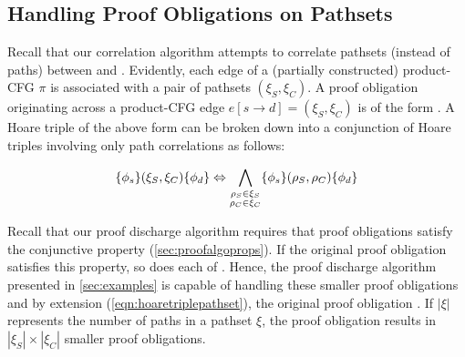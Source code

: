 \subsection{Handling Proof Obligations on Pathsets}
\label{sec:pathsethoaretriples}
Recall that our correlation algorithm attempts to correlate pathsets (instead of paths) between \sprog{} and \cprog{}.
Evidently, each edge of a (partially constructed) product-CFG $\pi$ is associated with a pair of pathsets $(\xi_S,\xi_C)$.
A proof obligation originating across a product-CFG edge $e[s \rightarrow d]=(\xi_S,\xi_C)$ is of
the form .
A Hoare triple of the above form can be broken down into a conjunction of Hoare triples involving only path correlations as follows:

\begin{equation}
\label{eqn:hoaretriplepathset}
\{\phi_s\}(\xi_S,\xi_C)\{\phi_d\} \Leftrightarrow \bigwedge_{\substack{\rho_S \in \xi_S \\ \rho_C \in \xi_C}} \{\phi_s\}(\rho_S,\rho_C)\{\phi_d\}
\end{equation}

Recall that our proof discharge algorithm requires that proof obligations satisfy the conjunctive \recursiveRelation{} property (\cref{sec:proofalgoprops}).
If the original proof obligation  satisfies this property, so does each of .
Hence, the proof discharge algorithm presented in \cref{sec:examples} is capable of handling these smaller proof obligations
and by extension (\cref{eqn:hoaretriplepathset}), the original proof obligation .
If $|\xi|$ represents the number of paths in a pathset $\xi$, the proof obligation  results
in $|\xi_S| \times |\xi_C|$ smaller proof obligations.


